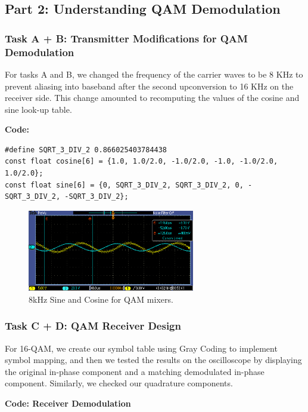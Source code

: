 \documentclass{article}
\begin{document}
\subsection{Part 2: Understanding QAM Demodulation}

\subsubsection{Task A + B: Transmitter Modifications for QAM Demodulation}
For tasks A and B, we changed the frequency of the carrier waves to be 8 KHz to prevent aliasing into baseband after the second upconversion to 16 KHz on the receiver side. This change amounted to recomputing the values of the cosine and sine look-up table.

\textbf{Code:}
\begin{verbatim}
#define SQRT_3_DIV_2 0.866025403784438
const float cosine[6] = {1.0, 1.0/2.0, -1.0/2.0, -1.0, -1.0/2.0, 1.0/2.0};
const float sine[6] = {0, SQRT_3_DIV_2, SQRT_3_DIV_2, 0, -SQRT_3_DIV_2, -SQRT_3_DIV_2};
\end{verbatim}

\begin{figure}[h]
  \begin{center}
    \includegraphics[width=0.65\textwidth]{img/task_2_b_oscilloscope.png}
    \caption{8kHz Sine and Cosine for QAM mixers.}
  \end{center}
\end{figure}

\pagebreak

\subsubsection{Task C + D: QAM Receiver Design}
For 16-QAM, we create our symbol table using Gray Coding to implement symbol mapping, and then we tested the results on the oscilloscope by displaying the original in-phase component and a matching demodulated in-phase component. Similarly, we checked our quadrature components.

\textbf{Code: Receiver Demodulation}
\end{document}
